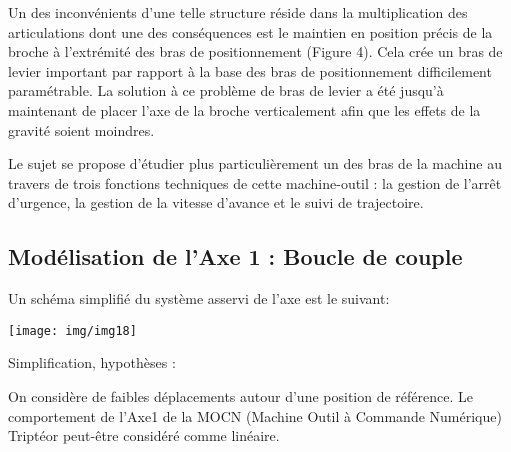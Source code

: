 Un des inconvénients d'une telle structure réside dans la multiplication des articulations dont une des conséquences est le maintien en position précis de la broche à l'extrémité des bras de positionnement (Figure 4). Cela crée un bras de levier important par rapport à la base des bras de positionnement difficilement paramétrable. La solution à ce problème de bras de levier a été jusqu'à maintenant de placer l'axe de la broche verticalement afin que les effets de la gravité soient moindres.


Le sujet se propose d'étudier plus particulièrement un des bras de la machine au travers de trois fonctions techniques de cette machine-outil : la gestion de l'arrêt d'urgence, la gestion de la vitesse d'avance et le suivi de trajectoire.


\newpage

\subsection{Modélisation de l'Axe 1 : Boucle de couple}

Un schéma simplifié du système asservi de l'axe est le suivant:

\begin{center}
 \texttt{[image: img/img18]}
\end{center}

Simplification, hypothèses :

On considère de faibles déplacements autour d'une position de référence. Le comportement de l'Axe1 de la MOCN (Machine Outil à Commande Numérique) Triptéor peut-être considéré comme linéaire.


